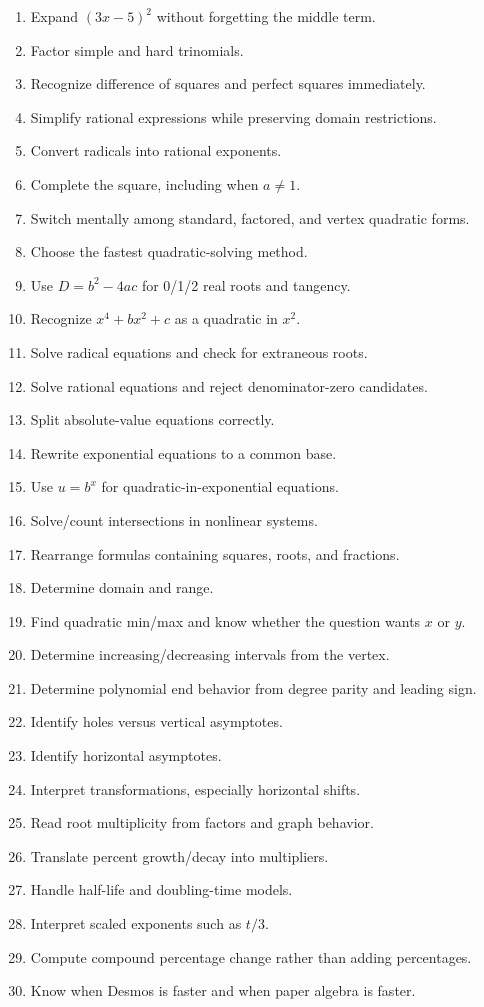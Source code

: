 \documentclass[
]{article}
\providecommand{\tightlist}{%
  \setlength{\itemsep}{0pt}\setlength{\parskip}{0pt}}
\begin{document}
\begin{enumerate}
\def\labelenumi{\arabic{enumi}.}
\tightlist
\item
  Expand \((3x-5)^2\) without forgetting the middle term.
\item
  Factor simple and hard trinomials.
\item
  Recognize difference of squares and perfect squares immediately.
\item
  Simplify rational expressions while preserving domain restrictions.
\item
  Convert radicals into rational exponents.
\item
  Complete the square, including when \(a\neq1\).
\item
  Switch mentally among standard, factored, and vertex quadratic forms.
\item
  Choose the fastest quadratic-solving method.
\item
  Use \(D=b^2-4ac\) for 0/1/2 real roots and tangency.
\item
  Recognize \(x^4+bx^2+c\) as a quadratic in \(x^2\).
\item
  Solve radical equations and check for extraneous roots.
\item
  Solve rational equations and reject denominator-zero candidates.
\item
  Split absolute-value equations correctly.
\item
  Rewrite exponential equations to a common base.
\item
  Use \(u=b^x\) for quadratic-in-exponential equations.
\item
  Solve/count intersections in nonlinear systems.
\item
  Rearrange formulas containing squares, roots, and fractions.
\item
  Determine domain and range.
\item
  Find quadratic min/max and know whether the question wants \(x\) or
  \(y\).
\item
  Determine increasing/decreasing intervals from the vertex.
\item
  Determine polynomial end behavior from degree parity and leading sign.
\item
  Identify holes versus vertical asymptotes.
\item
  Identify horizontal asymptotes.
\item
  Interpret transformations, especially horizontal shifts.
\item
  Read root multiplicity from factors and graph behavior.
\item
  Translate percent growth/decay into multipliers.
\item
  Handle half-life and doubling-time models.
\item
  Interpret scaled exponents such as \(t/3\).
\item
  Compute compound percentage change rather than adding percentages.
\item
  Know when Desmos is faster and when paper algebra is faster.
\end{enumerate}
\end{document}
